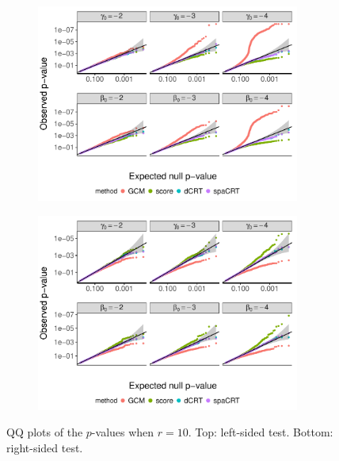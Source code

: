 \documentclass[12pt]{article}
\theoremstyle{definition}
\begin{document}
  \begin{figure}[!ht]
	\centering
	\begin{subfigure}{\textwidth}
		\centering
		\includegraphics[width=0.95\textwidth]{figures-and-tables/simulation/NB-regression/QQ/disp-10-QQ-LEFT.pdf}
	\end{subfigure}

	\begin{subfigure}{\textwidth}
		\centering
		\includegraphics[width=0.95\textwidth]{figures-and-tables/simulation/NB-regression/QQ/disp-10-QQ-RIGHT.pdf}
	\end{subfigure}
	\caption{QQ plots of the $p$-values when $r=10$. Top: left-sided test. Bottom: right-sided test. }
	\label{fig:simulation-CRISPR-screens-disp-10-QQ}
  \end{figure}
  
\end{document}
